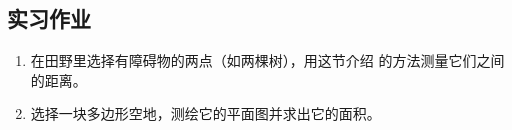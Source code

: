 



































































































\subsection*{实习作业}
\begin{enumerate}
    \item 在田野里选择有障碍物的两点（如两棵树），用这节介绍
    的方法测量它们之间的距离。
    \item 选择一块多边形空地，测绘它的平面图并求出它的面积。
\end{enumerate}

